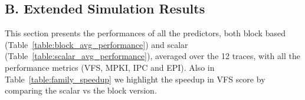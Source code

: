 \documentclass[11pt,a4paper,twocolumn]{article}
\begin{document}
\subsection*{B. Extended Simulation Results}
\label{sec:appendix_results}

This section presents the performances of all the predictors, both block based (Table~\ref{table:block_avg_performance}) and  scalar (Table~\ref{table:scalar_avg_performance}), averaged over the 12 traces, with all the performance metrics (VFS, MPKI, IPC and EPI). Also in Table~\ref{table:family_speedup} we highlight the speedup in VFS score by comparing the scalar vs the block version.

\end{document}
